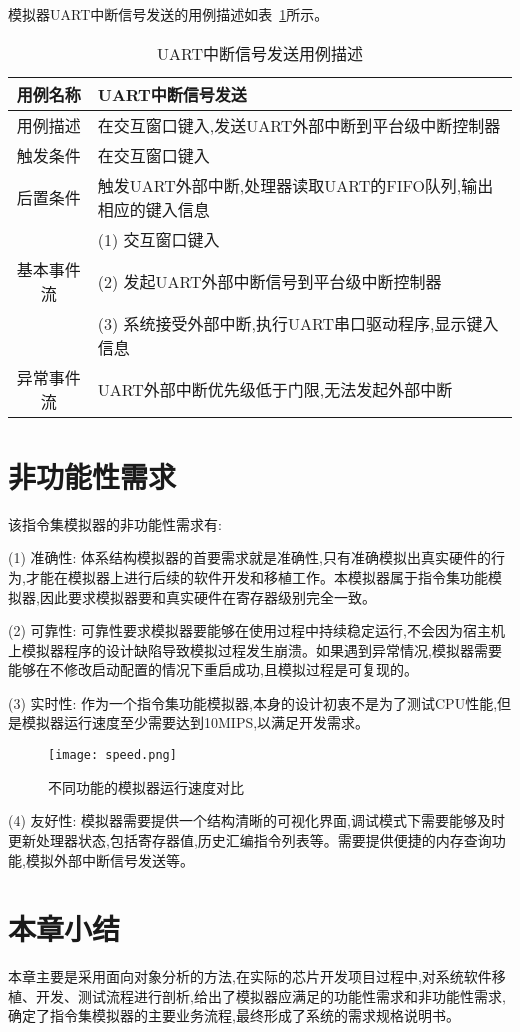 模拟器UART中断信号发送的用例描述如表~\ref{tab:yongli5}所示。
\begin{table}[H]
  \centering
  \caption{UART中断信号发送用例描述}
  \label{tab:yongli5}
  \renewcommand\arraystretch{1.1}
  \begin{tabular}{cl}
    \toprule
用例名称 & UART中断信号发送\\
    \midrule
用例描述	& \multicolumn{1}{p{9cm}}{在交互窗口键入,发送UART外部中断到平台级中断控制器}\\ \hline
触发条件	& \multicolumn{1}{p{9cm}}{在交互窗口键入}\\ \hline
后置条件	& \multicolumn{1}{p{9cm}}{触发UART外部中断,处理器读取UART的FIFO队列,输出相应的键入信息}\\ \hline
 &	\multicolumn{1}{p{9cm}}{(1)	交互窗口键入}\\
 基本事件流 & \multicolumn{1}{p{9cm}}{(2)	发起UART外部中断信号到平台级中断控制器}\\
 & \multicolumn{1}{p{9cm}}{(3)	系统接受外部中断,执行UART串口驱动程序,显示键入信息}\\ \hline
异常事件流 &	\multicolumn{1}{p{9cm}}{UART外部中断优先级低于门限,无法发起外部中断}\\
    \bottomrule
  \end{tabular}
\end{table}


\section{非功能性需求}

该指令集模拟器的非功能性需求有:


(1) 准确性: 体系结构模拟器的首要需求就是准确性,只有准确模拟出真实硬件的行为,才能在模拟器上进行后续的软件开发和移植工作。本模拟器属于指令集功能模拟器,因此要求模拟器要和真实硬件在寄存器级别完全一致。


(2) 可靠性: 可靠性要求模拟器要能够在使用过程中持续稳定运行,不会因为宿主机上模拟器程序的设计缺陷导致模拟过程发生崩溃。如果遇到异常情况,模拟器需要能够在不修改启动配置的情况下重启成功,且模拟过程是可复现的。


(3) 实时性: 作为一个指令集功能模拟器,本身的设计初衷不是为了测试CPU性能,但是模拟器运行速度至少需要达到10MIPS,以满足开发需求。

\begin{figure}[H]
  \centering
  \texttt{[image: speed.png]}
  \caption{不同功能的模拟器运行速度对比}
  \label{fig:speed}
\end{figure}


(4) 友好性: 模拟器需要提供一个结构清晰的可视化界面,调试模式下需要能够及时更新处理器状态,包括寄存器值,历史汇编指令列表等。需要提供便捷的内存查询功能,模拟外部中断信号发送等。




\section{本章小结}

本章主要是采用面向对象分析的方法,在实际的芯片开发项目过程中,对系统软件移植、开发、测试流程进行剖析,给出了模拟器应满足的功能性需求和非功能性需求,确定了指令集模拟器的主要业务流程,最终形成了系统的需求规格说明书。



